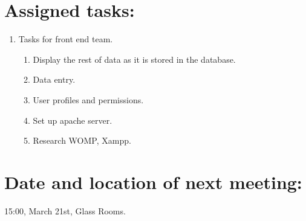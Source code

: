 \documentclass[a4paper, 12pt]{article}
\begin{document}
	\newpage
	\section{Assigned tasks:}
		\begin{enumerate}[label*=\arabic*.]
			\item Tasks for front end team.
			\begin{enumerate}[label*=\arabic*.]
				\item Display the rest of data as it is stored in the database.
				\item Data entry.
				\item User profiles and permissions.
				\item Set up apache server.
				\item Research WOMP, Xampp.
			\end{enumerate}
		\end{enumerate}

	\section{Date and location of next meeting:}
		15:00, March 21st, Glass Rooms.
\end{document}

